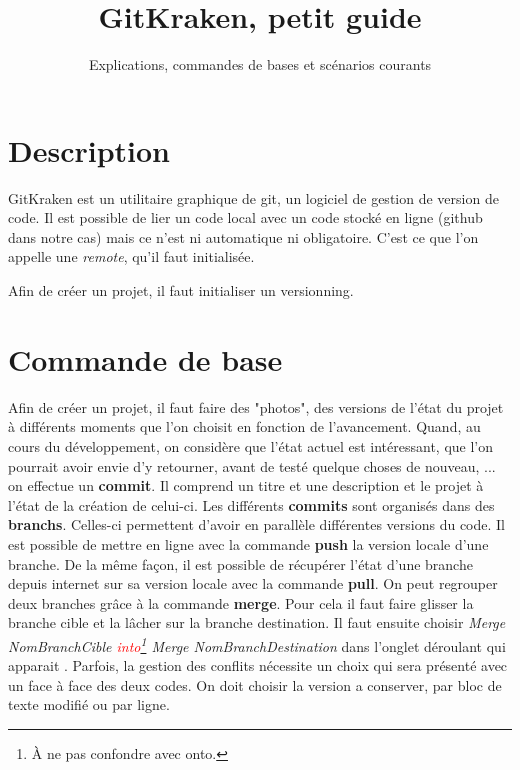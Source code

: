 \documentclass[12pt]{article}
\begin{document}
 
 



\title{GitKraken, petit guide}%
\author{Explications, commandes de bases et scénarios courants} 
\maketitle
\section{Description}
GitKraken est un utilitaire graphique de git, un logiciel de gestion de version de code. Il est possible de lier un code local avec un code stocké en ligne (github dans notre cas) mais ce n'est ni automatique ni obligatoire. C'est ce que l'on appelle une \emph{remote}, qu'il faut initialisée.

Afin de créer un projet, il faut initialiser un versionning.

\section{Commande de base}
Afin de créer un projet, il faut faire des "photos", des versions de l'état du projet à différents moments que l'on choisit en fonction de l'avancement. Quand, au cours du développement, on considère que l'état actuel est intéressant, que l'on pourrait avoir envie d'y retourner, avant de testé quelque choses de nouveau, ... on effectue un \textbf{commit}. Il comprend un titre et une description et le projet à l'état de la création de celui-ci. Les différents \textbf{commits} sont organisés dans des \textbf{branchs}. Celles-ci permettent d'avoir en parallèle différentes versions du code. Il est possible de mettre en ligne avec la commande \textbf{push} la version locale d'une branche. De la même façon, il est possible de récupérer l'état d'une branche depuis internet sur sa version locale avec la commande \textbf{pull}. On peut regrouper deux branches grâce à la commande \textbf{merge}. Pour cela il faut faire glisser la branche cible et la lâcher sur la branche destination. Il faut ensuite choisir \emph{Merge NomBranchCible \textcolor{red}{into}\footnote{À ne pas confondre avec onto.} Merge NomBranchDestination} dans l'onglet déroulant qui apparait . Parfois, la gestion des conflits nécessite un choix qui sera présenté avec un face à face des deux codes. On doit choisir la version a conserver, par bloc de texte modifié ou par ligne.
\end{document}
